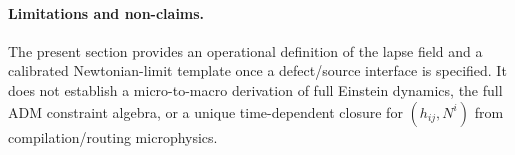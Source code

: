 \paragraph{Limitations and non-claims.}
The present section provides an operational definition of the lapse field and a calibrated Newtonian-limit template once a defect/source interface is specified.
It does not establish a micro-to-macro derivation of full Einstein dynamics, the full ADM constraint algebra, or a unique time-dependent closure for $(h_{ij},N^i)$ from compilation/routing microphysics.


